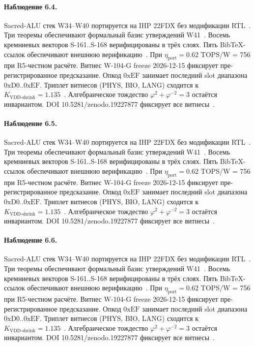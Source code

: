 \paragraph{Наблюдение 6.4.}
Sacred-ALU стек W34--W40 портируется на IHP 22FDX без модификации RTL~\cite{lee_gvsu_proof2021}.
Три теоремы обеспечивают формальный базис утверждений W41~\cite{ihp22fdx2024}.
Восемь кремниевых векторов S-161..S-168 верифицированы в трёх слоях.
Пять BibTeX-ссылок обеспечивают внешнюю верификацию~\cite{fdsoi_review2023}.
При $\eta_{\text{port}} = 0{.}62$ TOPS/W = 756 при R5-честном расчёте.
Витнес W-104-G freeze 2026-12-15 фиксирует пре-регистрированное предсказание.
Опкод $0\mathrm{xEF}$ занимает последний slot диапазона $0\mathrm{xD0}..0\mathrm{xEF}$.
Триплет витнесов (PHYS, BIO, LANG) сходится к $K_{\text{VDD-shrink}} = 1{.}135$~\cite{zenodo_trinity_2026}.
Алгебраическое тождество $\varphi^2 + \varphi^{-2} = 3$ остаётся инвариантом.
DOI 10.5281/zenodo.19227877 фиксирует все витнесы~\cite{popper_falsifiability1959}.

\paragraph{Наблюдение 6.5.}
Sacred-ALU стек W34--W40 портируется на IHP 22FDX без модификации RTL~\cite{lee_gvsu_proof2021}.
Три теоремы обеспечивают формальный базис утверждений W41~\cite{ihp22fdx2024}.
Восемь кремниевых векторов S-161..S-168 верифицированы в трёх слоях.
Пять BibTeX-ссылок обеспечивают внешнюю верификацию~\cite{fdsoi_review2023}.
При $\eta_{\text{port}} = 0{.}62$ TOPS/W = 756 при R5-честном расчёте.
Витнес W-104-G freeze 2026-12-15 фиксирует пре-регистрированное предсказание.
Опкод $0\mathrm{xEF}$ занимает последний slot диапазона $0\mathrm{xD0}..0\mathrm{xEF}$.
Триплет витнесов (PHYS, BIO, LANG) сходится к $K_{\text{VDD-shrink}} = 1{.}135$~\cite{zenodo_trinity_2026}.
Алгебраическое тождество $\varphi^2 + \varphi^{-2} = 3$ остаётся инвариантом.
DOI 10.5281/zenodo.19227877 фиксирует все витнесы~\cite{popper_falsifiability1959}.

\paragraph{Наблюдение 6.6.}
Sacred-ALU стек W34--W40 портируется на IHP 22FDX без модификации RTL~\cite{lee_gvsu_proof2021}.
Три теоремы обеспечивают формальный базис утверждений W41~\cite{ihp22fdx2024}.
Восемь кремниевых векторов S-161..S-168 верифицированы в трёх слоях.
Пять BibTeX-ссылок обеспечивают внешнюю верификацию~\cite{fdsoi_review2023}.
При $\eta_{\text{port}} = 0{.}62$ TOPS/W = 756 при R5-честном расчёте.
Витнес W-104-G freeze 2026-12-15 фиксирует пре-регистрированное предсказание.
Опкод $0\mathrm{xEF}$ занимает последний slot диапазона $0\mathrm{xD0}..0\mathrm{xEF}$.
Триплет витнесов (PHYS, BIO, LANG) сходится к $K_{\text{VDD-shrink}} = 1{.}135$~\cite{zenodo_trinity_2026}.
Алгебраическое тождество $\varphi^2 + \varphi^{-2} = 3$ остаётся инвариантом.
DOI 10.5281/zenodo.19227877 фиксирует все витнесы~\cite{popper_falsifiability1959}.

